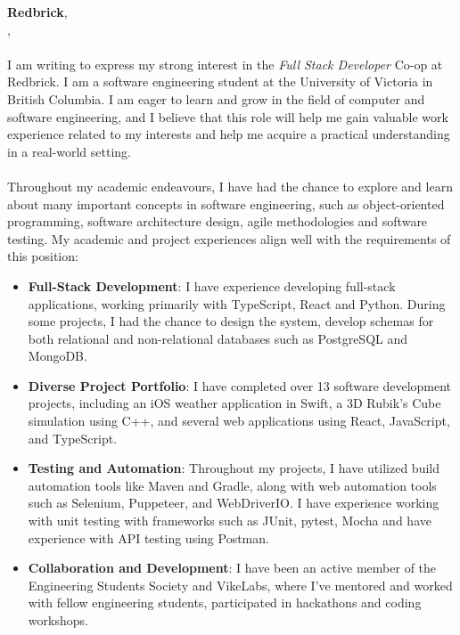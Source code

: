 \documentclass[a4paper, 12pt, oneside]{letter}
\newcommand{\Position}{Full Stack Developer}
\newcommand{\CompanyName}{Redbrick}
\newcommand{\CompanyNameSuffix}{}
\newcommand{\Division}{Shift}
\newcommand{\LocationCity}{Victoria}
\newcommand{\LocationState}{British Columbia}
\begin{document}
\vspace{1em}
\textbf{\CompanyName}\textbf{\CompanyNameSuffix},
\text{\Division}\\
\vspace{20pt}\text{\LocationCity}, \text{\LocationState} \\
\vspace{10pt} \\
 I am writing to express my strong interest in the \textit{\Position} Co-op at \CompanyName. I am a software engineering student at the University of Victoria in British Columbia. I am eager to learn and grow in the field of computer and software engineering, and I believe that this role will help me gain valuable work experience related to my interests and help me acquire a practical understanding in a real-world setting. \vspace{-7pt}\\\\
Throughout my academic endeavours, I have had the chance to explore and learn about many important concepts in software engineering, such as object-oriented programming, software architecture design, agile methodologies and software testing. My academic and project experiences align well with the requirements of this position: 
\begin{itemize}
	\item \textbf{Full-Stack Development}: I have experience developing full-stack applications, working primarily with TypeScript, React and Python. During some projects, I had the chance to design the system, develop schemas for both relational and non-relational databases such as {PostgreSQL} and {MongoDB}.

	\item \textbf{Diverse Project Portfolio}: I have completed over 13 software development projects, including an iOS weather application in Swift, a 3D Rubik's Cube simulation using C++, and several web applications using React, JavaScript, and TypeScript.

	\item \textbf{Testing and Automation}: Throughout my projects, I have utilized build automation tools like Maven and Gradle, along with web automation tools such as Selenium, Puppeteer, and WebDriverIO. I have experience working with unit testing with frameworks such as JUnit, pytest, Mocha and have experience with API testing using Postman.

	\item \textbf{Collaboration and Development}: I have been an active member of the Engineering Students Society and VikeLabs, where I've mentored and worked with fellow engineering students, participated in hackathons and coding workshops.
\end{itemize}
\end{document}
